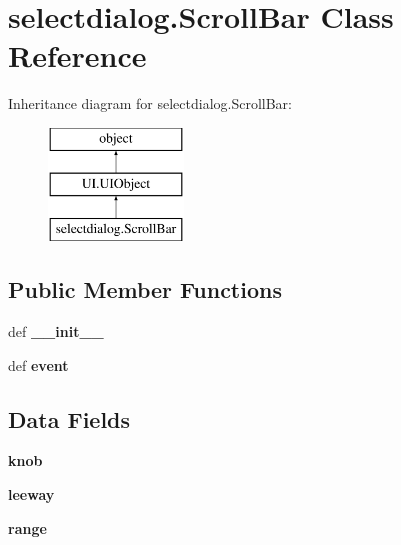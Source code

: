 \hypertarget{classselectdialog_1_1ScrollBar}{\section{selectdialog.\-Scroll\-Bar Class Reference}
\label{classselectdialog_1_1ScrollBar}
}
Inheritance diagram for selectdialog.\-Scroll\-Bar\-:\begin{figure}[H]
\begin{center}
\leavevmode
\includegraphics[height=3.000000cm]{classselectdialog_1_1ScrollBar}
\end{center}
\end{figure}
\subsection*{Public Member Functions}
\begin{DoxyCompactItemize}
\item 
\hypertarget{classselectdialog_1_1ScrollBar_a3375710b6598051346ce2975d02c9241}{def {\bfseries \-\_\-\-\_\-init\-\_\-\-\_\-}}\label{classselectdialog_1_1ScrollBar_a3375710b6598051346ce2975d02c9241}

\item 
\hypertarget{classselectdialog_1_1ScrollBar_a7bf13e4b604a0f0310d3277100181190}{def {\bfseries event}}\label{classselectdialog_1_1ScrollBar_a7bf13e4b604a0f0310d3277100181190}

\end{DoxyCompactItemize}
\subsection*{Data Fields}
\begin{DoxyCompactItemize}
\item 
\hypertarget{classselectdialog_1_1ScrollBar_ace5ef6ca6a29a08e3db0a8a081608ed6}{{\bfseries knob}}\label{classselectdialog_1_1ScrollBar_ace5ef6ca6a29a08e3db0a8a081608ed6}

\item 
\hypertarget{classselectdialog_1_1ScrollBar_a3e65a342db23bc06d679ca3bdca229a8}{{\bfseries leeway}}\label{classselectdialog_1_1ScrollBar_a3e65a342db23bc06d679ca3bdca229a8}

\item 
\hypertarget{classselectdialog_1_1ScrollBar_aa1cfe0c9dea47744a2561fbe6dba74fa}{{\bfseries range}}\label{classselectdialog_1_1ScrollBar_aa1cfe0c9dea47744a2561fbe6dba74fa}

\end{DoxyCompactItemize}
